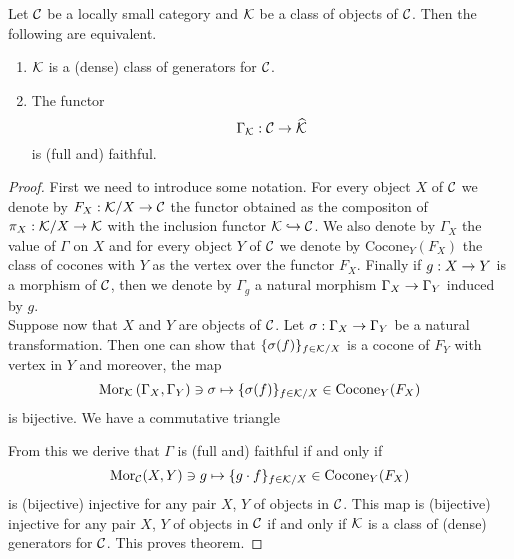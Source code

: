 \begin{theorem}\label{theorem:generatorclassesdescribedcategorically}
Let ${\mathcal C}$ be a locally small category and ${\mathcal K}$ be a class of objects of ${\mathcal C}$. Then the following are equivalent.
\begin{enumerate}[label=\emph{\textbf{(\roman*)}}, leftmargin=1.5em]
\item ${\mathcal K}$ is a (dense) class of generators for ${\mathcal C}$.
\item The functor
$$\Gamma_{{\mathcal K}}:{\mathcal C}\rightarrow \widehat{{\mathcal K}}$$
is (full and) faithful.
\end{enumerate}
\end{theorem}
\begin{proof}
First we need to introduce some notation. For every object $X$ of ${\mathcal C}$ we denote by $F_X:{\mathcal K}/X\rightarrow {\mathcal C}$ the functor obtained as the compositon of $\pi_X:{\mathcal K}/X\rightarrow {\mathcal K}$ with the inclusion functor ${\mathcal K}\hookrightarrow {\mathcal C}$. We also denote by $\Gamma_X$ the value of $\Gamma$ on $X$ and for every object $Y$ of ${\mathcal C}$ we denote by  $\mathrm{Cocone}_Y(F_X)$ the class of cocones with $Y$ as the vertex over the functor $F_X$. Finally if $g:X\rightarrow Y$ is a morphism of ${\mathcal C}$, then we denote by $\Gamma_g$ a natural morphism $\Gamma_X\rightarrow \Gamma_Y$ induced by $g$.\\
Suppose now that $X$ and $Y$ are objects of ${\mathcal C}$. Let $\sigma:\Gamma_X\rightarrow \Gamma_Y$ be a natural transformation. Then one can show that $\{\sigma(f)\}_{f\in {\mathcal K}/X}$ is a cocone of $F_Y$ with vertex in $Y$ and moreover, the map
$$\mathrm{Mor}_{{\mathcal K}}\left(\Gamma_X,\Gamma_Y\right)\ni \sigma \mapsto \{\sigma(f)\}_{f\in {\mathcal K}/X}\in \mathrm{Cocone}_{Y}(F_X)$$
is bijective. We have a commutative triangle
\begin{center}
\end{center}
From this we derive that $\Gamma$ is (full and) faithful if and only if 
$$\mathrm{Mor}_{{\mathcal C}}(X,Y)\ni g\mapsto \{g\cdot f\}_{f\in {\mathcal K}/X}\in \mathrm{Cocone}_Y(F_X)$$
 is (bijective) injective for any pair $X$, $Y$ of objects in ${\mathcal C}$. This map is (bijective) injective for any pair $X$, $Y$ of objects in ${\mathcal C}$ if and only if ${\mathcal K}$ is a class of (dense) generators for ${\mathcal C}$. This proves theorem.
\end{proof}

